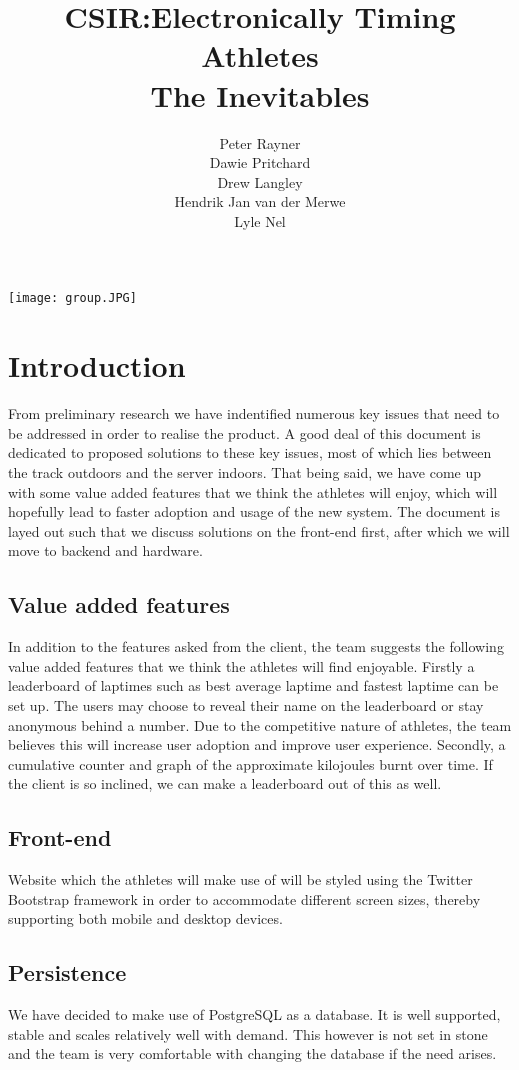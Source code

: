 \documentclass{article}
\title{CSIR:Electronically Timing Athletes\\
The Inevitables
}
\author{  
            Peter Rayner\\
            Dawie Pritchard\\
            Drew Langley\\
            Hendrik Jan van der Merwe\\
            Lyle Nel\\
        }
\begin{document}
\maketitle

\texttt{[image: group.JPG]}

\newpage

\tableofcontents

\newpage


\section{Introduction}
From preliminary research we have indentified numerous key issues that need to be addressed in order to realise the product. A good deal of this document is dedicated to proposed solutions to these key issues, most of which lies between the track outdoors and the server indoors. That being said, we have come up with some value added features that we think the athletes will enjoy, which will hopefully lead to faster adoption and usage of the new system. The document is layed out such that we discuss solutions on the front-end first, after which we will move to backend and hardware.

\subsection{Value added features}
In addition to the features asked from the client, the team suggests the following value added features that we think the athletes will find enjoyable. Firstly a leaderboard of laptimes such as best average laptime and fastest laptime can be set up. The users may choose to reveal their name on the leaderboard or stay anonymous behind a number. Due to the competitive nature of athletes, the team believes this will increase user adoption and improve user experience. Secondly, a cumulative counter and graph of the approximate kilojoules burnt over time. If the client is so inclined, we can make a leaderboard out of this as well.

\subsection{Front-end}
Website which the athletes will make use of will be styled using the Twitter Bootstrap framework in order to accommodate different screen sizes, thereby supporting both mobile and desktop devices.

\subsection{Persistence}
We have decided to make use of PostgreSQL as a database. It is well supported, stable and scales relatively well with demand. This however is not set in stone and the team is very comfortable with changing the database if the need arises.
\end{document}
